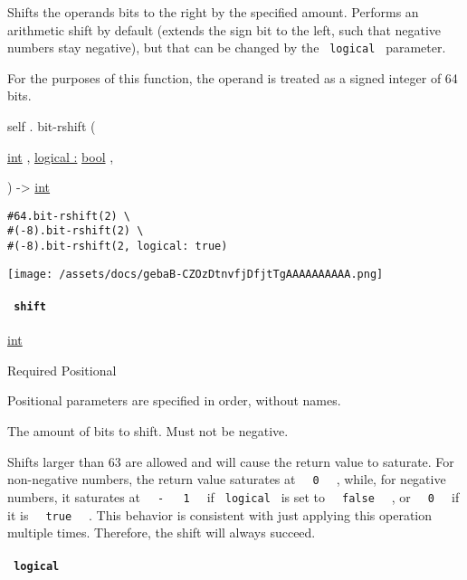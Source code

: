 Shifts the operand\textquotesingle s bits to the right by the specified
amount. Performs an arithmetic shift by default (extends the sign bit to
the left, such that negative numbers stay negative), but that can be
changed by the \texttt{\ logical\ } parameter.

For the purposes of this function, the operand is treated as a signed
integer of 64 bits.

self { . } { bit-rshift } (

{ \href{/docs/reference/foundations/int/}{int} , } {
\hyperref[definitions-bit-rshift-parameters-logical]{logical :}
\href{/docs/reference/foundations/bool/}{bool} , }

) -\textgreater{} \href{/docs/reference/foundations/int/}{int}

\begin{verbatim}
#64.bit-rshift(2) \
#(-8).bit-rshift(2) \
#(-8).bit-rshift(2, logical: true)
\end{verbatim}

\texttt{[image: /assets/docs/gebaB-CZOzDtnvfjDfjtTgAAAAAAAAAA.png]}

\paragraph{\texorpdfstring{\texttt{\ shift\ }}{ shift }}\label{definitions-bit-rshift-shift}

\href{/docs/reference/foundations/int/}{int}

{Required} {{ Positional }}

\label{definitions-bit-rshift-shift-positional-tooltip}
Positional parameters are specified in order, without names.

The amount of bits to shift. Must not be negative.

Shifts larger than 63 are allowed and will cause the return value to
saturate. For non-negative numbers, the return value saturates at
\texttt{\ }{\texttt{\ 0\ }}\texttt{\ } , while, for negative numbers, it
saturates at
\texttt{\ }{\texttt{\ -\ }}\texttt{\ }{\texttt{\ 1\ }}\texttt{\ } if
\texttt{\ logical\ } is set to
\texttt{\ }{\texttt{\ false\ }}\texttt{\ } , or
\texttt{\ }{\texttt{\ 0\ }}\texttt{\ } if it is
\texttt{\ }{\texttt{\ true\ }}\texttt{\ } . This behavior is consistent
with just applying this operation multiple times. Therefore, the shift
will always succeed.

\paragraph{\texorpdfstring{\texttt{\ logical\ }}{ logical }}\label{definitions-bit-rshift-logical}

